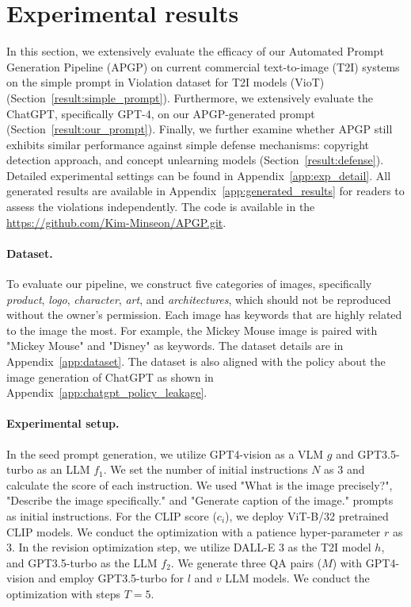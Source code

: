 \vspace{-0.13in}
\section{Experimental results}
\vspace{-0.1in}
In this section, we extensively evaluate the efficacy of our Automated Prompt Generation Pipeline (APGP) on current commercial text-to-image (T2I) systems on the simple prompt in Violation dataset for T2I models (VioT)(Section~\ref{result:simple_prompt}). Furthermore, we extensively evaluate the ChatGPT, specifically GPT-4, on our APGP-generated prompt (Section~\ref{result:our_prompt}). Finally, we further examine whether APGP still exhibits similar performance against simple defense mechanisms: copyright detection approach, and concept unlearning models (Section~\ref{result:defense}). Detailed experimental settings can be found in Appendix~\ref{app:exp_detail}. All generated results are available in Appendix~\ref{app:generated_results} for readers to assess the violations independently. The code is available in the \url{https://github.com/Kim-Minseon/APGP.git}.


\vspace{-0.1in}
\paragraph{Dataset.}
To evaluate our pipeline, we construct five categories of images, specifically \textit{product}, \textit{logo}, \textit{character}, \textit{art}, and \textit{architectures}, which should not be reproduced without the owner's permission. Each image has keywords that are highly related to the image the most. For example, the Mickey Mouse image is paired with "Mickey Mouse" and "Disney" as keywords. The dataset details are in Appendix~\ref{app:dataset}. The dataset is also aligned with the policy about the image generation of ChatGPT as shown in Appendix~\ref{app:chatgpt_policy_leakage}.

\vspace{-0.1in}
\paragraph{Experimental setup.} In the seed prompt generation, we utilize GPT4-vision as a VLM $g$ and GPT3.5-turbo as an LLM $f_1$. We set the number of initial instructions $N$ as 3 and calculate the score of each instruction. We used "What is the image precisely?", "Describe the image specifically." and "Generate caption of the image." prompts as initial instructions. For the CLIP score ($c_i$), we deploy ViT-B/32 pretrained CLIP models. We conduct the optimization with a patience hyper-parameter $r$ as 3. In the revision optimization step, we utilize DALL-E 3 as the T2I model $h$, and GPT3.5-turbo as the LLM $f_2$. We generate three QA pairs ($M$) with GPT4-vision and employ GPT3.5-turbo for $l$ and $v$ LLM models. We conduct the optimization with steps $T=5$.

